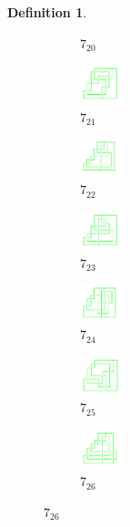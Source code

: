 \documentclass{article}
\theoremstyle{definition}
\newtheorem{defn}[thm]{Definition}
\theoremstyle{theorem}
\theoremstyle{proposition}
\theoremstyle{corollary}
\begin{document}
\begin{defn}
\begin{figure}[H]
\begin{subfigure}{0.075\textwidth}
    \caption{$7_{20}$} 
    \end{subfigure}
    \begin{subfigure}{0.075\textwidth}
    \includegraphics[width=1.25cm]{../Midterm_Poster/grid_diagram/handcuff_7_21.png}
    \caption{$7_{21}$} 
    \end{subfigure}
    \begin{subfigure}{0.075\textwidth}
    \includegraphics[width=1.25cm]{../Midterm_Poster/grid_diagram/handcuff_7_22.png}
    \caption{$7_{22}$} 
    \end{subfigure}
    \begin{subfigure}{0.075\textwidth}
    \includegraphics[width=1.25cm]{../Midterm_Poster/grid_diagram/handcuff_7_23.png}
    \caption{$7_{23}$} 
    \end{subfigure}
    \begin{subfigure}{0.075\textwidth}
    \includegraphics[width=1.25cm]{../Midterm_Poster/grid_diagram/handcuff_7_24.png}
    \caption{$7_{24}$} 
    \end{subfigure}
    \begin{subfigure}{0.075\textwidth}
    \includegraphics[width=1.25cm]{../Midterm_Poster/grid_diagram/handcuff_7_25.png}
    \caption{$7_{25}$} 
    \end{subfigure}
    \begin{subfigure}{0.075\textwidth}
    \includegraphics[width=1.25cm]{../Midterm_Poster/grid_diagram/handcuff_7_26.png}
    \caption{$7_{26}$} 
    \end{subfigure}

\end{figure}
\end{defn}
\end{document}
